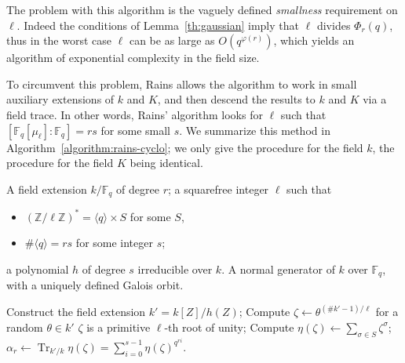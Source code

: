 \documentclass[12pt]{article}
\theoremstyle{plain}
\theoremstyle{definition}
\DeclareMathOperator{\trace}{Tr} %
\def\Z{\ensuremath{\mathbb{Z}}}
\def\F{\ensuremath{\mathbb{F}}}
\def\euler{\ensuremath{\varphi}}
\newcounter{algorithm}
\begin{document}
The problem with this algorithm is the vaguely defined
\emph{smallness} requirement on $\ell$. Indeed the conditions of
Lemma~\ref{th:gaussian} imply that $\ell$ divides $\Phi_r(q)$, thus in
the worst case $\ell$ can be as large as $O(q^{\euler(r)})$, which
yields an algorithm of exponential complexity in the field size.

To circumvent this problem, Rains allows the algorithm to work in
small auxiliary extensions of $k$ and $K$, and then descend the
results to $k$ and $K$ via a field trace. In other words, Rains'
algorithm looks for $\ell$ such that $[\F_q[\mu_\ell]:\F_q]=rs$ for
some small $s$. We summarize this method in
Algorithm~\ref{algorithm:rains-cyclo}; we only give the procedure for
the field $k$, the procedure for the field $K$ being identical.

\begin{algorithm}
  \label{algorithm:rains-cyclo}
  \begin{algorithmic}[1]
    \REQUIRE A field extension $k/\F_q$ of degree $r$; a squarefree
    integer $\ell$ such that
    \begin{itemize}
    \item $(\Z/\ell\Z)^\ast = \langle q\rangle \times S$ for some $S$,
    \item $\#\langle q\rangle = rs$ for some integer $s$;
    \end{itemize}
    a polynomial $h$ of degree $s$ irreducible over $k$.
    \ENSURE A normal generator of $k$ over $\F_q$,
    with a uniquely defined Galois orbit.
    
    \STATE Construct the field extension $k'=k[Z]/h(Z)$;
    \REPEAT
    \STATE Compute $\zeta\leftarrow \theta^{(\#k'-1)/\ell}$ for a random $\theta\in k'$
    \UNTIL $\zeta$ is a primitive $\ell$-th root of unity;
    \STATE\label{algorithm:rains-cyclo:period} Compute $\eta(\zeta) \leftarrow \sum_{\sigma\in S}\zeta^\sigma$;
    \RETURN\label{algorithm:rains-cyclo:trace} $\alpha_r \leftarrow \trace_{k'/k}\eta(\zeta) = \sum_{i=0}^{s-1}\eta(\zeta)^{q^{ri}}$.
  \end{algorithmic}
\end{algorithm}
\end{document}
